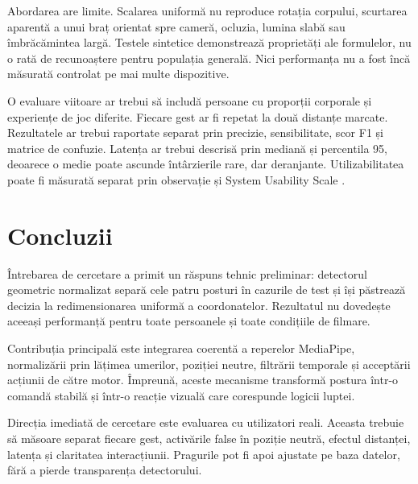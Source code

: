 \documentclass[12pt, a4paper]{article}
\begin{document}
Abordarea are limite. Scalarea uniformă nu reproduce rotația corpului, scurtarea
aparentă a unui braț orientat spre cameră, ocluzia, lumina slabă sau îmbrăcămintea
largă. Testele sintetice demonstrează proprietăți ale formulelor, nu o rată de
recunoaștere pentru populația generală. Nici performanța nu a fost încă măsurată
controlat pe mai multe dispozitive.

O evaluare viitoare ar trebui să includă persoane cu proporții corporale și
experiențe de joc diferite. Fiecare gest ar fi repetat la două distanțe marcate.
Rezultatele ar trebui raportate separat prin precizie, sensibilitate, scor F1 și
matrice de confuzie. Latența ar trebui descrisă prin mediană și percentila 95, deoarece
o medie poate ascunde întârzierile rare, dar deranjante. Utilizabilitatea poate fi
măsurată separat prin observație și System Usability Scale \parencite{brooke1996}.

\section{Concluzii}

Întrebarea de cercetare a primit un răspuns tehnic preliminar: detectorul geometric
normalizat separă cele patru posturi în cazurile de test și își păstrează decizia la
redimensionarea uniformă a coordonatelor. Rezultatul nu dovedește aceeași performanță
pentru toate persoanele și toate condițiile de filmare.

Contribuția principală este integrarea coerentă a reperelor MediaPipe, normalizării
prin lățimea umerilor, poziției neutre, filtrării temporale și acceptării acțiunii de
către motor. Împreună, aceste mecanisme transformă postura într-o comandă stabilă și
într-o reacție vizuală care corespunde logicii luptei.

Direcția imediată de cercetare este evaluarea cu utilizatori reali. Aceasta trebuie să
măsoare separat fiecare gest, activările false în poziție neutră, efectul distanței,
latența și claritatea interacțiunii. Pragurile pot fi apoi ajustate pe baza datelor,
fără a pierde transparența detectorului.

\newpage
\printbibliography[title={Referințe Bibliografice}]
\end{document}
